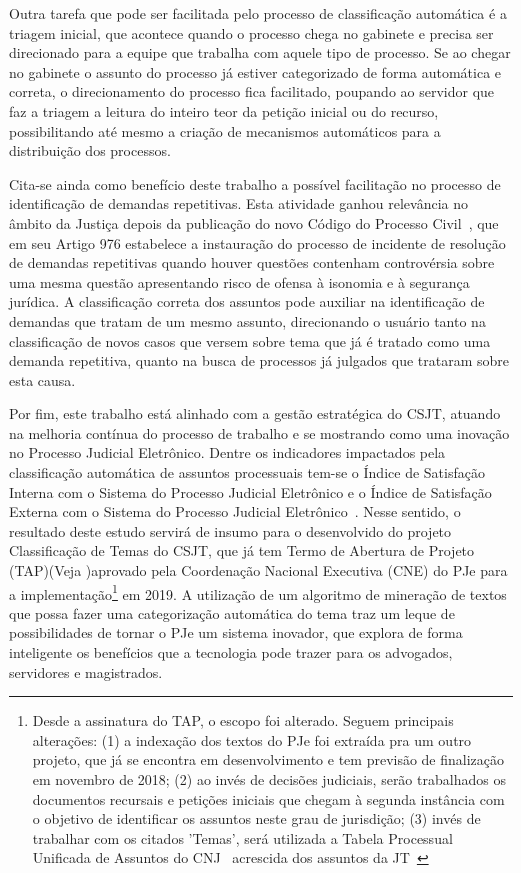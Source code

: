 Outra tarefa que pode ser facilitada pelo processo de classificação automática é a triagem inicial, que acontece quando o processo chega no gabinete e precisa ser direcionado para a equipe que trabalha com aquele tipo de processo. Se ao chegar no gabinete o assunto do processo já estiver categorizado de forma automática e correta, o direcionamento do processo fica facilitado, poupando ao servidor que faz a triagem a leitura do inteiro teor da petição inicial ou do recurso, possibilitando até mesmo a criação de mecanismos automáticos para a distribuição dos processos. 

Cita-se ainda como benefício deste trabalho a possível facilitação no processo de identificação de demandas repetitivas. Esta atividade ganhou relevância no âmbito da Justiça depois da publicação do novo Código do Processo Civil~\cite{novocpc}, que em seu Artigo 976 estabelece a instauração do processo de incidente de resolução de demandas repetitivas quando houver questões contenham controvérsia sobre uma mesma questão apresentando risco de ofensa à isonomia  e à segurança jurídica. A classificação correta dos assuntos pode auxiliar na identificação de demandas que tratam de um mesmo assunto, direcionando o usuário tanto na classificação de novos casos que versem sobre tema que já é tratado como uma demanda repetitiva, quanto na busca de processos já julgados que trataram sobre esta causa.


Por fim, este trabalho está alinhado com a gestão estratégica do CSJT, atuando na melhoria contínua do processo de trabalho e se mostrando como uma inovação no Processo Judicial Eletrônico. Dentre os indicadores impactados pela classificação automática de assuntos processuais tem-se o Índice de Satisfação Interna com o Sistema do Processo Judicial Eletrônico e o Índice de Satisfação Externa com o Sistema do Processo Judicial Eletrônico~\cite{conselho_superior_da_justica_do_trabalho_glossario_2017}. Nesse sentido, o resultado deste estudo servirá de insumo para o desenvolvido do projeto Classificação de Temas do CSJT, que já tem Termo de Abertura de Projeto (TAP)(Veja )aprovado pela Coordenação Nacional Executiva (CNE) do PJe para a implementação\footnote{Desde a assinatura do TAP, o escopo foi alterado. Seguem principais alterações: (1) a indexação dos textos do PJe foi extraída pra um outro projeto, que já se encontra em desenvolvimento e tem previsão de finalização em novembro de 2018; (2) ao invés de decisões judiciais, serão trabalhados os documentos recursais e petições iniciais que chegam à segunda instância com o objetivo de identificar os assuntos neste grau de jurisdição; (3) invés de trabalhar com os citados 'Temas', será utilizada a Tabela Processual Unificada de Assuntos do CNJ~\cite{tpucnj} acrescida dos assuntos da JT~\cite{tputst} } em 2019. A utilização de um algoritmo de mineração de textos que possa fazer uma categorização automática do tema traz um leque de possibilidades de tornar o PJe  um sistema inovador, que explora de forma inteligente os benefícios que a tecnologia pode trazer para os advogados, servidores e magistrados. 

